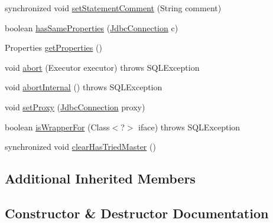 \begin{DoxyCompactItemize}
\item 
synchronized void \mbox{\hyperlink{classcom_1_1mysql_1_1cj_1_1jdbc_1_1ha_1_1_replication_my_s_q_l_connection_a7afc9e0c6196c0acd9f60ca99c5e7b8a}{set\+Statement\+Comment}} (String comment)
\item 
boolean \mbox{\hyperlink{classcom_1_1mysql_1_1cj_1_1jdbc_1_1ha_1_1_replication_my_s_q_l_connection_abceb3d3792b7bb70f6ba4f38c5c4a048}{has\+Same\+Properties}} (\mbox{\hyperlink{interfacecom_1_1mysql_1_1cj_1_1jdbc_1_1_jdbc_connection}{Jdbc\+Connection}} c)
\item 
Properties \mbox{\hyperlink{classcom_1_1mysql_1_1cj_1_1jdbc_1_1ha_1_1_replication_my_s_q_l_connection_a04a60b0695519e98a4827f90161f52da}{get\+Properties}} ()
\item 
void \mbox{\hyperlink{classcom_1_1mysql_1_1cj_1_1jdbc_1_1ha_1_1_replication_my_s_q_l_connection_a862c7c014fbae13891910e2d0bcb907a}{abort}} (Executor executor)  throws S\+Q\+L\+Exception 
\item 
void \mbox{\hyperlink{classcom_1_1mysql_1_1cj_1_1jdbc_1_1ha_1_1_replication_my_s_q_l_connection_a10917e3985284c676e558743b04a4adc}{abort\+Internal}} ()  throws S\+Q\+L\+Exception 
\item 
void \mbox{\hyperlink{classcom_1_1mysql_1_1cj_1_1jdbc_1_1ha_1_1_replication_my_s_q_l_connection_af7d0735f7bca5fc4e4aa56f2037e7676}{set\+Proxy}} (\mbox{\hyperlink{interfacecom_1_1mysql_1_1cj_1_1jdbc_1_1_jdbc_connection}{Jdbc\+Connection}} proxy)
\item 
boolean \mbox{\hyperlink{classcom_1_1mysql_1_1cj_1_1jdbc_1_1ha_1_1_replication_my_s_q_l_connection_a89f48d6730af4279fc4cb3d96cffd725}{is\+Wrapper\+For}} (Class$<$?$>$ iface)  throws S\+Q\+L\+Exception 
\item 
synchronized void \mbox{\hyperlink{classcom_1_1mysql_1_1cj_1_1jdbc_1_1ha_1_1_replication_my_s_q_l_connection_aa198df19289a6a2ba3ae72ec55c10f62}{clear\+Has\+Tried\+Master}} ()
\end{DoxyCompactItemize}
\subsection*{Additional Inherited Members}


\subsection{Constructor \& Destructor Documentation}
\mbox{\label{classcom_1_1mysql_1_1cj_1_1jdbc_1_1ha_1_1_replication_my_s_q_l_connection_a3913b09eb11f8d9c5b45bc9f540e3a9e}} 

